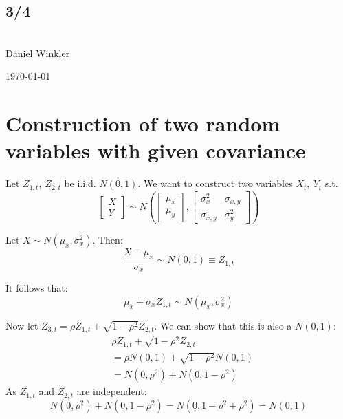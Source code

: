 \message{ !name(three_four.tex)}\documentclass[11pt]{article}
\begin{document}

\thispagestyle{empty}
\begin{center}
  \section*{3/4} %
  \textbf{}\\
  \large{Daniel Winkler}
  
  {\large \today\par}
\end{center}

\section{Construction of two random variables with given covariance}
\label{sec:constr-two-rand}



Let $Z_{1,t},\ Z_{2,t}$ be i.i.d. $N(0,1)$. We want to construct two variables $X_t,\ Y_t$ s.t.
\begin{equation}
  \label{eq:1}
  \begin{bmatrix}
    X\\
    Y
  \end{bmatrix} \sim
  N \left(
    \begin{bmatrix}
      \mu_x\\
      \mu_y
    \end{bmatrix},
    \begin{bmatrix}
      \sigma^2_x & \sigma_{x,y}\\
      \sigma_{x,y} & \sigma_y^2
    \end{bmatrix}
\right)
\end{equation}

Let $X \sim N(\mu_x, \sigma^2_x)$. Then:
\begin{equation}
  \label{eq:2}
  \frac{X-\mu_x}{\sigma_x} \sim N(0,1) \equiv Z_{1,t}
\end{equation}

It follows that:
\begin{equation}
  \label{eq:3}
  \mu_x + \sigma_x Z_{1,t} \sim N(\mu_x, \sigma^2_x)
\end{equation}

Now let $Z_{3,t} = \rho Z_{1,t} + \sqrt{1-\rho^2} Z_{2,t}$. We can show that this is also a $N(0,1)$:
\begin{equation}
  \label{eq:4}
  \begin{split}
    &\rho Z_{1,t} + \sqrt{1-\rho^2} Z_{2,t}\\
    &=\rho N(0,1) + \sqrt{1-\rho^2} N(0,1)\\
    &=N(0,\rho^2) + N(0, 1-\rho^2)
  \end{split}
\end{equation}
As $Z_{1,t}$ and $Z_{2,t}$ are independent:
\begin{equation}
  \label{eq:5}
    N(0,\rho^2) + N(0, 1-\rho^2) = N(0,1-\rho^2+\rho^2) = N(0,1)
\end{equation}
\end{document}
